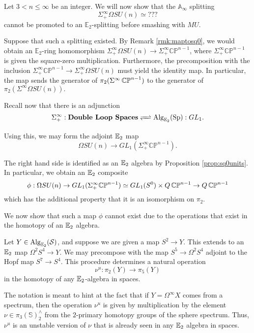 
Let $3< n\leq \infty$ be an integer.  We will now show that the $\mathbb{A}_\infty$ splitting $$\Sigma^{\infty}_+ \Omega SU(n) \simeq ???$$ cannot be promoted to an $\mathbb{E}_2$-splitting before smashing with $MU$.  

Suppose that such a splitting existed.  By Remark \ref{rmk:maptosq0}, we would obtain an $\mathbb{E}_2$-ring homomorphism $\Sigma^{\infty}_+ \Omega SU(n) \rightarrow \Sigma^{\infty}_+ \mathbb{CP}^{n-1}$, where $\Sigma^{\infty}_+ \mathbb{CP}^{n-1}$ is given the square-zero multiplication.  Furthermore, the precomposition with the inclusion $\Sigma^{\infty}_+ \mathbb{CP}^{n-1} \longrightarrow \Sigma^{\infty}_+ \Omega SU(n)$ must yield the identity map.  In particular, the map sends the generator of $\pi_2(\Sigma^{\infty}\operatorname{\mathbb{CP}}^{n-1})$ to the generator of $\pi_2(\Sigma^{\infty}\Omega SU(n)).$  



Recall now that there is an adjunction \cite{MQRT}
$$\Sigma^{\infty}_+:\textbf{Double Loop Spaces}  \xrightleftharpoons{\quad} \Alg_{\E_2}(\Sp) :GL_1.$$

Using this, we may form the adjoint $\operatorname{\mathbb{E}}_2$ map
$$\Omega SU(n) \rightarrow GL_1(\Sigma^{\infty}_+ \mathbb{CP}^{n-1}).$$

The right hand side is identified as an $\operatorname{\mathbb{E}}_2$ algebra by Proposition \ref{prop:sq0units}.  In particular, we obtain an $\operatorname{\mathbb{E}}_2$ composite $$\phi: \Omega SU(n) \to GL_1(\Sigma^{\infty}_+ \mathbb{CP}^{n-1}) \simeq  GL_1(S^0) \times Q\operatorname{\mathbb{CP}}^{n-1} \to Q\operatorname{\mathbb{CP}}^{n-1}$$ which has the additional property that it is an isomorphism on $\pi_2$.

We now show that such a map $\phi$ cannot exist due to the operations that exist in the homotopy of an $\operatorname{\mathbb{E}}_2$ algebra.  

\begin{obs}Let $Y\in \operatorname{\text{Alg}}_{\operatorname{\mathbb{E}}_2}(\operatorname{\mathcal{S}})$, and suppose we are given a map $S^2\to Y$.  This extends to an $\operatorname{\mathbb{E}}_2$ map $\Omega^2 S^4 \to Y.$  We may precompose with the map $S^5 \to \Omega^2 S^4$ adjoint to the Hopf map $S^7\to S^4$.  This procedure determines a natural operation $$\nu^u: \pi_2(Y) \to \pi_5(Y)$$ in the homotopy of any $\operatorname{\mathbb{E}}_2$-algebra in spaces.  
\end{obs}

\begin{rmk} \label{rmk:multnu1}
The notation is meant to hint at the fact that if $Y = \Omega^\infty X$ comes from a spectrum, then the operation $\nu^u$ is given by multiplication by the element $\nu \in \pi_3(\mathbb{S})^{\wedge}_2$ from the $2$-primary homotopy groups of the sphere spectrum.  Thus, $\nu^u$ is an unstable version of $\nu$ that is already seen in any $\operatorname{\mathbb{E}}_2$ algebra in spaces.    
\end{rmk}

